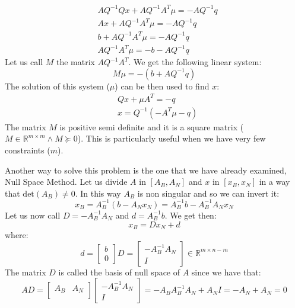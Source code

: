 \begin{align}
    &AQ^{-1}Qx + AQ^{-1}A^T\mu = - AQ^{-1}q\\
    &Ax + AQ^{-1}A^T\mu = - AQ^{-1}q\\
    &b + AQ^{-1}A^T\mu = - AQ^{-1}q\\
    &AQ^{-1}A^T\mu = -b - AQ^{-1}q
\end{align}
Let us call $M$ the matrix $AQ^{-1}A^T$. We get the following linear system:
\begin{equation}
    M \mu = - (b + AQ^{-1}q)
\end{equation}
The solution of this system ($\mu$) can be then used to find $x$:
\begin{align}
    &Qx + \mu A^T = -q\\
    &x = Q^{-1}(-A^T \mu - q)
\end{align}
The matrix $M$ is positive semi definite and it is a square matrix ($M \in \mathbb{R}^{m \times m} \wedge M \succeq 0$). This is particularly useful when we have very few constraints ($m$).
\par Another way to solve this problem is the one that we have already examined, Null Space Method. Let us divide $A$ in $[A_B,A_N]$ and $x$ in $[x_B,x_N]$ in a way that $\text{det}(A_B) \neq 0$. In this way $A_B$ is non singular and so we can invert it:
\begin{equation}
    x_B = A_B^{-1}(b - A_N x_N) = A_B^{-1}b - A_B^{-1} A_N x_N
\end{equation}
Let us now call $D = - A_B^{-1} A_N$ and $d = A_B^{-1}b$. We get then:
\begin{equation}
    x_B = D x_N + d
\end{equation}
where:
\begin{equation}
    d = \begin{bmatrix}
    b \\
    0
    \end{bmatrix}
    D = \begin{bmatrix}
    - A_B^{-1} A_N \\
    I
    \end{bmatrix} \in \mathbb{R}^{m \times n - m}
\end{equation}
The matrix $D$ is called the basis of null space of $A$ since we have that:
\begin{equation}
    A D = \begin{bmatrix}
    A_B & A_N \\
    \end{bmatrix} \begin{bmatrix}
    - A_B^{-1} A_N \\
    I
    \end{bmatrix} = - A_B A_B^{-1} A_N + A_N I = - A_N + A_N = 0
\end{equation}
